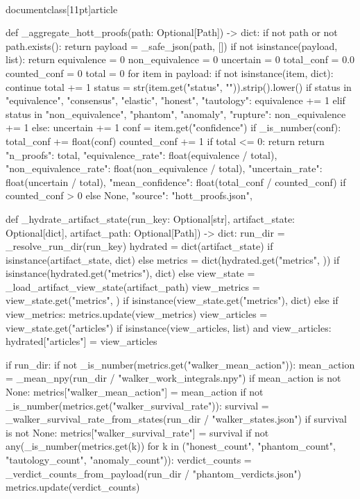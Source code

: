 \\documentclass[11pt]{article}
\begin{document}
\begin{CodeBlock}
def _aggregate_hott_proofs(path: Optional[Path]) -> dict:
    if not path or not path.exists():
        return {}
    payload = _safe_json(path, [])
    if not isinstance(payload, list):
        return {}
    equivalence = 0
    non_equivalence = 0
    uncertain = 0
    total_conf = 0.0
    counted_conf = 0
    total = 0
    for item in payload:
        if not isinstance(item, dict):
            continue
        total += 1
        status = str(item.get("status", "")).strip().lower()
        if status in {"equivalence", "consensus", "elastic", "honest", "tautology"}:
            equivalence += 1
        elif status in {"non_equivalence", "phantom", "anomaly", "rupture"}:
            non_equivalence += 1
        else:
            uncertain += 1
        conf = item.get("confidence")
        if _is_number(conf):
            total_conf += float(conf)
            counted_conf += 1
    if total <= 0:
        return {}
    return {
        "n_proofs": total,
        "equivalence_rate": float(equivalence / total),
        "non_equivalence_rate": float(non_equivalence / total),
        "uncertain_rate": float(uncertain / total),
        "mean_confidence": float(total_conf / counted_conf) if counted_conf > 0 else None,
        "source": "hott_proofs.json",
    }


def _hydrate_artifact_state(run_key: Optional[str], artifact_state: Optional[dict], artifact_path: Optional[Path]) -> dict:
    run_dir = _resolve_run_dir(run_key)
    hydrated = dict(artifact_state) if isinstance(artifact_state, dict) else {}
    metrics = dict(hydrated.get("metrics", {})) if isinstance(hydrated.get("metrics"), dict) else {}
    view_state = _load_artifact_view_state(artifact_path)
    view_metrics = view_state.get("metrics", {}) if isinstance(view_state.get("metrics"), dict) else {}
    if view_metrics:
        metrics.update(view_metrics)
    view_articles = view_state.get("articles")
    if isinstance(view_articles, list) and view_articles:
        hydrated["articles"] = view_articles

    if run_dir:
        if not _is_number(metrics.get("walker_mean_action")):
            mean_action = _mean_npy(run_dir / "walker_work_integrals.npy")
            if mean_action is not None:
                metrics["walker_mean_action"] = mean_action
        if not _is_number(metrics.get("walker_survival_rate")):
            survival = _walker_survival_rate_from_states(run_dir / "walker_states.json")
            if survival is not None:
                metrics["walker_survival_rate"] = survival
        if not any(_is_number(metrics.get(k)) for k in ("honest_count", "phantom_count", "tautology_count", "anomaly_count")):
            verdict_counts = _verdict_counts_from_payload(run_dir / "phantom_verdicts.json")
            metrics.update(verdict_counts)


\end{CodeBlock}
\end{document}
